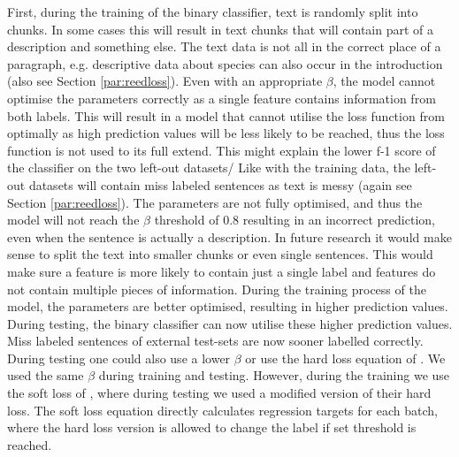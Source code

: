 \documentclass[a4paper, 12pt, oneside]{book} %
\begin{document}
First, during the training of the binary classifier, text is randomly split into chunks. 
In some cases this will result in text chunks that will contain part of a description and something else.
The text data is not all in the correct place of a paragraph, e.g. descriptive data about species can also occur in the introduction (also see Section \ref{par:reedloss}).
Even with an appropriate \(\beta\), the model cannot optimise the parameters correctly as a single feature contains information from both labels.
This will result in a model that cannot utilise the loss function from \textcite{reed_training_2015} optimally as high prediction values will be less likely to be reached, thus the loss function is not used to its full extend.
This might explain the lower f-1 score of the classifier on the two left-out datasets/
Like with the training data, the left-out datasets will contain miss labeled sentences as text is messy (again see Section \ref{par:reedloss}).
The parameters are not fully optimised, and thus the model will not reach the \(\beta\) threshold of 0.8 resulting in an incorrect prediction, even when the sentence is actually a description.
In future research it would make sense to split the text into smaller chunks or even single sentences.
This would make sure a feature is more likely to contain just a single label and features do not contain multiple pieces of information.
During the training process of the model, the parameters are better optimised, resulting in higher prediction values.
During testing, the binary classifier can now utilise these higher prediction values.
Miss labeled sentences of external test-sets are now sooner labelled correctly.
During testing one could also use a lower \(\beta\) or use the hard loss equation of \textcite{reed_training_2015}.
We used the same \(\beta\) during training and testing.
However, during the training we use the soft loss of \textcite{reed_training_2015}, where during testing we used a modified version of their hard loss.
The soft loss equation directly calculates regression targets for each batch, where the hard loss version is allowed to change the label if set threshold is reached.
\end{document}
